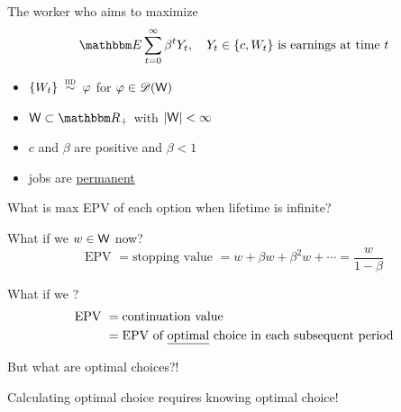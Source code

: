 \begin{frame}
    
    The worker who aims to maximize 
    \begin{equation}
        \EE \sum_{t=0}^{\infty} \beta^t Y_t,
        \quad 
        \text{$Y_t \in \{c, W_t\}$ is earnings at time $t$}
    \end{equation}

        \vspace{0.4em}
    \begin{itemize}
        \item $\{ W_t \} \stackrel{\textrm{ {\sc iid }}} {\sim} \varphi$ for $\varphi \in \mathscr D(\mathsf W)$ 
        \vspace{0.4em}
        \item $\Wsf \subset \RR_+$ with $|\mathsf W| < \infty$
        \vspace{0.4em}
        \item $c$ and $\beta$ are positive and $\beta < 1$
        \vspace{0.4em}
        \item jobs are \underline{permanent} 
    \end{itemize}


\end{frame}


\begin{frame}
    
    What is max EPV of each option when lifetime is infinite?  

    What if we  $w \in \mathsf W$ now?
    \begin{equation*}
        \text{EPV }
        = \text{stopping value }
        = w + \beta w + \beta^2 w + \cdots 
        = \frac{w}{1 - \beta}
    \end{equation*}

    What if we ?
    \begin{align*}
        \text{EPV }
        & = \text{continuation value }
        \\
        & = \text{EPV of \underline{optimal} choice in each subsequent period}
    \end{align*}

    But what are optimal choices?!

    Calculating optimal choice requires knowing optimal choice!

\end{frame}

